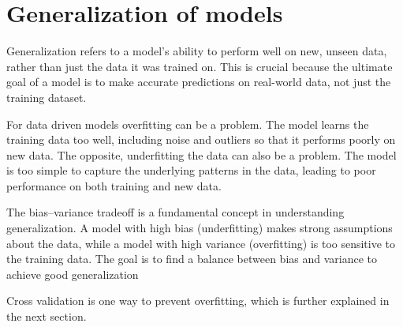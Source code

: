 \section{Generalization of models} \label{sec:generalization}
Generalization refers to a model's ability to perform well on new, unseen data, rather than just the data it was trained on. This is crucial because the ultimate goal of a model is to make accurate predictions on real-world data, not just the training dataset.

For data driven models overfitting can be a problem. The model learns the training data too well, including noise and outliers so that it performs poorly on new data. The opposite, underfitting the data can also be a problem. The model is too simple to capture the underlying patterns in the data, leading to poor performance on both training and new data.  

The bias–variance tradeoff is a fundamental concept in understanding generalization. A model with high bias (underfitting) makes strong assumptions about the data, while a model with high variance (overfitting) is too sensitive to the training data. The goal is to find a balance between bias and variance to achieve good generalization

Cross validation is one way to prevent overfitting, which is further explained in the next section.